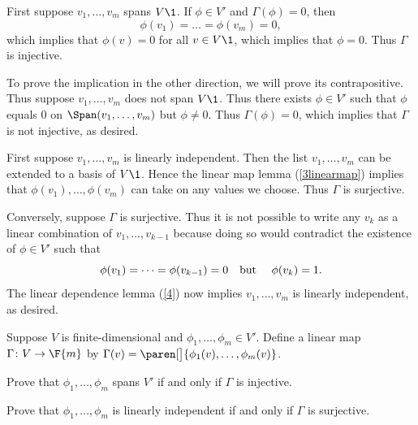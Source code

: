 \begin{Solution}
\begin{subtheorem}
\item
First suppose $v_1, \dots, v_m$ spans $V\1$. If $\phi \in V'$ and $\Gamma(\phi) = 0$, then
\[
\phi(v_1) = \dots = \phi(v_m) = 0,
\]
which implies that $\phi(v) = 0$ for all $v \in V\1$, which implies that $\phi = 0$. Thus $\Gamma$ is injective.

To prove the implication in the other direction, we will prove its contrapositive. Thus suppose $v_1, \ldots, v_m$ does not span $V\1$. Thus there exists $\phi \in V'$ such that $\phi$ equals $0$ on $\Span(v_1, \ldots, v_m)$ but $\phi \ne 0$. Thus $\Gamma(\phi) = 0$, which implies that $\Gamma$ is not injective, as desired.

\item
First suppose $v_1, \dots, v_m$ is linearly independent. Then the list $v_1, \dots, v_m$ can be extended to a basis of $V\1$. Hence the linear map lemma (\ref{3linearmap}) implies that $\phi(v_1), \dots, \phi(v_m)$ can take on any values we choose. Thus $\Gamma$ is surjective.

Conversely, suppose $\Gamma$ is surjective. Thus it is not possible to write any $v_k$ as a linear combination of $v_1, \dots, v_{k-1}$ because doing so would contradict the existence of $\phi \in V'$ such that
\[
\phi(v_1) = \dots = \phi(v_{k-1}) = 0 \text{\quad but \quad} \phi(v_k) = 1.
\]
The linear dependence lemma (\ref{4}) now implies $v_1, \dots, v_m$ is linearly independent, as desired.
\end{subtheorem}
\end{Solution}

\exercise
Suppose $V$ is finite-dimensional and $\phi_1, \dots, \phi_m \in V'\!$. Define a linear map $\Gamma \colon V \to \F{m}$ by
$
\Gamma(v) = \paren[\big]{ \phi_1(v), \dots, \phi_m(v) }$.
\begin{subtheorem}
\item
Prove that $\phi_1, \dots, \phi_m$ spans $V'$ if and only if $\Gamma$ is injective.
\item
Prove that $\phi_1, \dots, \phi_m$ is linearly independent if and only if $\Gamma$ is surjective.
\end{subtheorem}
\exercisesubtheoremend


